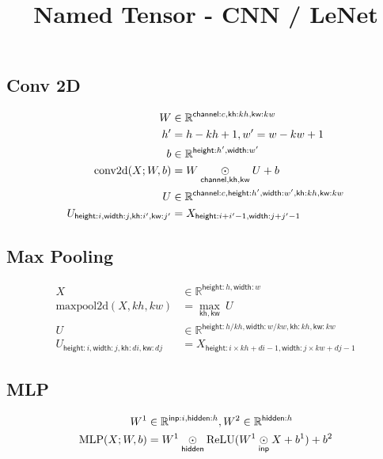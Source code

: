 \documentclass{article}
\title{Named Tensor - CNN / LeNet}
\date{}
\newcommand{\reals}[0]{\mathbb{R}}
\newcommand{\name}[1]{\mathsf{#1}}
\newcommand{\ndot}[1]{\mathbin{\mathop{\odot}\displaylimits_{\name{#1}}}}
\newcommand{\nfun}[2]{\underset{\name{#1}}{#2}}
\begin{document}
\maketitle
\date{}

\subsection*{Conv 2D}

\begin{align*} 
W &\in \reals^{\name{channel}:c,\name{kh}:kh, \name{kw}:kw} \\
h' &= h-kh +1,  w' = w-kw +1 \\
b &\in \reals^{\name{height}: h', \name{width}:w'}  \\
\text{conv2d}(X; W, b) &=  W \ndot{channel, kh, kw} U + b \\
U &\in \reals^{{\name{channel}:c, \name{height}:h',
\name{width}:w', \name{kh}:kh, \name{kw}:kw}}  \\
U_{\name{height}:i, \name{width}:j,  \name{kh}:i', \name{kw}:j'  } &= X_{\name{height}:i+i' - 1, \name{width}:j+j' - 1}  
\end{align*}

\subsection*{Max Pooling}

\begin{align*} 
X &\in \reals^{\name{height}: h, \name{width}:w} \\
\text{maxpool2d}(X, kh, kw) &=  \nfun{kh, kw}{\max}\  U \\
U &\in \reals^{{\name{height}:h / kh,
\name{width}:w / kw, \name{kh}:kh, \name{kw}:kw}}  \\
U_{\name{height}:i, \name{width}:j, \name{kh}:di, \name{kw}:dj  } & = X_{\name{height}:i \times kh + di -1, \name{width}:j \times kw + dj -1}  
\end{align*}

\subsection*{MLP}



\begin{align*} 
W^1 &\in \reals^{\name{inp}:i, \name{hidden}:h }, 
W^2 \in \reals^{ \name{hidden}:h } \\
\text{MLP}(X; W, b) &=  W^1 \ndot{hidden} \text{ReLU}(W^1 \ndot{inp} X + b^1) + b^2 
\end{align*}
\end{document}
